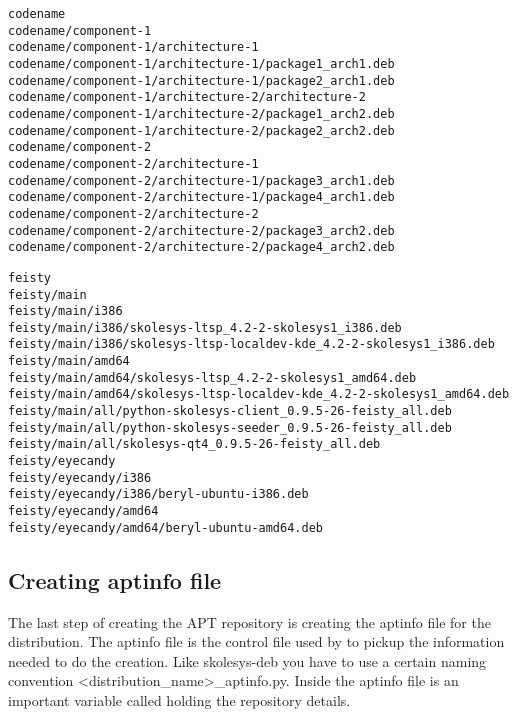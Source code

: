 \begin{verbatim}
codename
codename/component-1
codename/component-1/architecture-1
codename/component-1/architecture-1/package1_arch1.deb
codename/component-1/architecture-1/package2_arch1.deb
codename/component-1/architecture-2/architecture-2
codename/component-1/architecture-2/package1_arch2.deb
codename/component-1/architecture-2/package2_arch2.deb
codename/component-2
codename/component-2/architecture-1
codename/component-2/architecture-1/package3_arch1.deb
codename/component-2/architecture-1/package4_arch1.deb
codename/component-2/architecture-2
codename/component-2/architecture-2/package3_arch2.deb
codename/component-2/architecture-2/package4_arch2.deb
\end{verbatim}

\begin{verbatim}
feisty
feisty/main
feisty/main/i386
feisty/main/i386/skolesys-ltsp_4.2-2-skolesys1_i386.deb
feisty/main/i386/skolesys-ltsp-localdev-kde_4.2-2-skolesys1_i386.deb
feisty/main/amd64
feisty/main/amd64/skolesys-ltsp_4.2-2-skolesys1_amd64.deb
feisty/main/amd64/skolesys-ltsp-localdev-kde_4.2-2-skolesys1_amd64.deb
feisty/main/all/python-skolesys-client_0.9.5-26-feisty_all.deb
feisty/main/all/python-skolesys-seeder_0.9.5-26-feisty_all.deb
feisty/main/all/skolesys-qt4_0.9.5-26-feisty_all.deb
feisty/eyecandy
feisty/eyecandy/i386
feisty/eyecandy/i386/beryl-ubuntu-i386.deb
feisty/eyecandy/amd64
feisty/eyecandy/amd64/beryl-ubuntu-amd64.deb
\end{verbatim}

\subsection{Creating aptinfo file\label{skolesys-apt-aptinfo}}
The last step of creating the APT repository is creating the aptinfo file for the distribution. The aptinfo file is the control file used by  to pickup the information needed to do the creation. Like skolesys-deb you have to use a certain naming convention <distribution_name>_aptinfo.py. Inside the aptinfo file is an important variable called  holding the repository details. 



